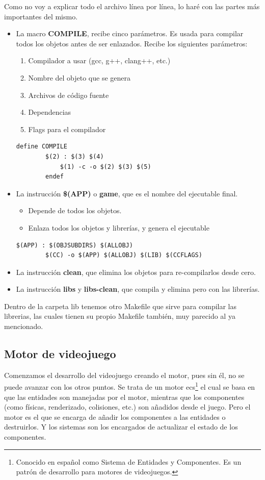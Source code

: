 Como no voy a explicar todo el archivo línea por línea, lo haré con las partes más importantes del mismo. 
\begin{itemize}
	\item La macro \textbf{COMPILE}, recibe cinco parámetros. Es usada para compilar todos los objetos antes de ser enlazados. Recibe los siguientes parámetros:
	\begin{enumerate}
		\item Compilador a usar (gcc, g++, clang++, etc.)
		\item Nombre del objeto que se genera
		\item Archivos de código fuente
		\item Dependencias
		\item Flags para el compilador
	\end{enumerate}
	\begin{lstlisting}[style=C, caption={Macro Compile del Makefile},label=macro-compile]
		define COMPILE
		$(2) : $(3) $(4)
			$(1) -c -o $(2) $(3) $(5)
		endef
	\end{lstlisting}
	\item La instrucción \textbf{\$(APP)} o \textbf{game}, que es el nombre del ejecutable final. 
	\begin{itemize} 
		\item Depende de todos los objetos. 
		\item Enlaza todos los objetos y librerías, y genera el ejecutable
	\end{itemize}
	\begin{lstlisting}[style=C, caption={Enlazado de los objetos y las librerías para generar el ejecutable.},label=library-linking]
	$(APP) : $(OBJSUBDIRS) $(ALLOBJ)
		$(CC) -o $(APP) $(ALLOBJ) $(LIB) $(CCFLAGS)
	\end{lstlisting}
	\item La instrucción \textbf{clean}, que elimina los objetos para re-compilarlos desde cero.
	\item La instrucción \textbf{libs} y \textbf{libs-clean}, que compila y elimina pero con las librerías.
\end{itemize}
Dentro de la carpeta lib tenemos otro Makefile que sirve para compilar las librerias, las cuales tienen su propio Makefile también, muy parecido al ya mencionado.

\subsection{Motor de videojuego}
Comenzamos el desarrollo del videojuego creando el motor, pues sin él, no se puede avanzar con los otros puntos. Se trata de un motor \gls{ecs}\footnote{Conocido en español como Sistema de Entidades y Componentes. Es un patrón de desarrollo para motores de videojuegos.} el cual se basa en que las entidades son manejadas por el motor, mientras que los componentes (como físicas, renderizado, colisiones, etc.) son añadidos desde el juego. Pero el motor es el que se encarga de añadir los componentes a las entidades o destruirlos. Y los sistemas son los encargados de actualizar el estado de los componentes.

